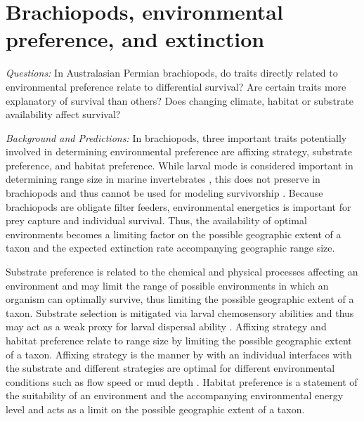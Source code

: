 \documentclass[12pt,letterpaper]{article}
\begin{document}
\section{Brachiopods, environmental preference, and extinction}

\textit{Questions:} In Australasian Permian brachiopods, do traits directly related to environmental preference relate to differential survival? Are certain traits more explanatory of survival than others? Does changing climate, habitat or substrate availability affect survival?

\textit{Background and Predictions:}
In brachiopods, three important traits potentially involved in determining environmental preference are affixing strategy, substrate preference, and habitat preference. While larval mode is considered important in determining range size in marine invertebrates \citep{Jablonski2006a,Jablonski1983}, this does not preserve in brachiopods and thus cannot be used for modeling survivorship \citep{Jablonski1983}. Because brachiopods are obligate filter feeders, environmental energetics is important for prey capture and individual survival. Thus, the availability of optimal environments becomes a limiting factor on the possible geographic extent of a taxon and the expected extinction rate accompanying geographic range size. 

Substrate preference is related to the chemical and physical processes affecting an environment and may limit the range of possible environments in which an organism can optimally survive, thus limiting the possible geographic extent of a taxon. Substrate selection is mitigated via larval chemosensory abilities and thus may act as a weak proxy for larval dispersal ability \citep{Jablonski2006a,Jablonski1983}. Affixing strategy and habitat preference relate to range size by limiting the possible geographic extent of a taxon. Affixing strategy is the manner by with an individual interfaces with the substrate and different strategies are optimal for different environmental conditions such as flow speed or mud depth \citep{Alexander1977,LaBarbera1978,LaBarbera1981}. Habitat preference is a statement of the suitability of an environment and the accompanying environmental energy level and acts as a limit on the possible geographic extent of a taxon. 
\end{document}
